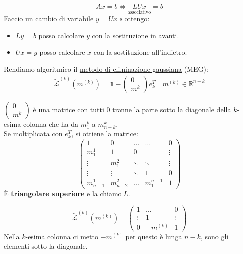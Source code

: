 \documentclass{article}
\begin{document}
$$Ax=b\Leftrightarrow \underset{\text{associativo}}{LUx}=b$$
Faccio un cambio di variabile $y=Ux$ e ottengo:
\begin{itemize}
    \item $Ly=b$ posso calcolare $y$ con la sostituzione in avanti.
    \item $Ux=y$ posso calcolare $x$ con la sostituzione all'indietro.
\end{itemize}

Rendiamo algoritmico il \underline{metodo di eliminazione gaussiana} (MEG):
\begin{align*}
    \widetilde{\mathcal{L}}^{(k)}\left(m^{(k)}\right)=\mathbb 1-\begin{pmatrix}
                                                                    0 \\
                                                                    m^k
                                                                \end{pmatrix}e^T_k\quad m^{(k)}\in \mathbb R^{n-k}
\end{align*}
\begin{note}{}{}
    $\begin{pmatrix}
            0 \\
            m^k
        \end{pmatrix}$ è una matrice con tutti $0$ tranne la parte sotto la diagonale della $k$-esima colonna che ha da $m^k_1$ a $m^k_{n-k}$.\\
    Se moltiplicata con $e^T_k$, si ottiene la matrice:
    \[\begin{pmatrix}
            1         & 0         & \dots  & \dots     & 0      \\
            m_1^1     & 1         & 0      &           & \vdots \\
            \vdots    & m^2_1     & \ddots & \ddots    & \vdots \\
            \vdots    & \vdots    & \ddots & 1         & 0      \\
            m^1_{n-1} & m^2_{n-2} & \dots  & m_1^{n-1} & 1
        \end{pmatrix}\]
    È \textbf{triangolare superiore} e la chiamo $L$.
\end{note}
\[\widetilde{\mathcal{L}}^{(k)}\left(m^{(k)}\right)=\begin{pmatrix}
        1      & \dots    & 0      \\
        \vdots & 1        & \vdots \\
        0      & -m^{(k)} & 1
    \end{pmatrix}\]
Nella $k$-esima colonna ci metto $-m^{(k)}$ per questo è lunga $n-k$, sono gli elementi sotto la diagonale.
\end{document}
